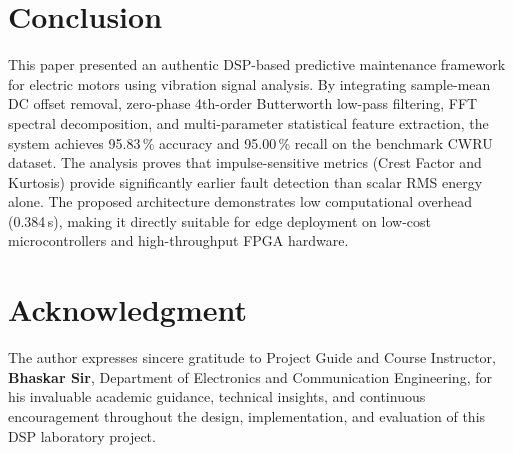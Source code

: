 \documentclass[conference,a4paper]{IEEEtran}
\begin{document}
\section{Conclusion}
This paper presented an authentic DSP-based predictive maintenance framework for electric motors using vibration signal analysis. By integrating sample-mean DC offset removal, zero-phase 4th-order Butterworth low-pass filtering, FFT spectral decomposition, and multi-parameter statistical feature extraction, the system achieves 95.83\,\% accuracy and 95.00\,\% recall on the benchmark CWRU dataset. The analysis proves that impulse-sensitive metrics (Crest Factor and Kurtosis) provide significantly earlier fault detection than scalar RMS energy alone. The proposed architecture demonstrates low computational overhead (0.384\,s), making it directly suitable for edge deployment on low-cost microcontrollers and high-throughput FPGA hardware.

\section*{Acknowledgment}
The author expresses sincere gratitude to Project Guide and Course Instructor, \textbf{Bhaskar Sir}, Department of Electronics and Communication Engineering, for his invaluable academic guidance, technical insights, and continuous encouragement throughout the design, implementation, and evaluation of this DSP laboratory project.



\end{document}
